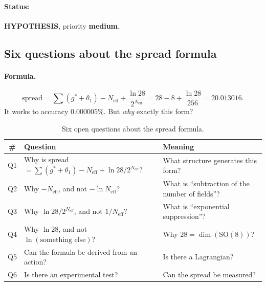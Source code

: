 \documentclass[11pt,a4paper]{article}
\newcommand{\SO}{\mathrm{SO}}
\newcommand{\Neff}{N_{\text{eff}}}
\theoremstyle{definition}
\begin{document}
\paragraph{Status:} \textbf{HYPOTHESIS}, priority \textbf{medium}.

\subsection{Six questions about the spread formula}
\label{subsec:six-spread-questions}

\paragraph{Formula.}
\begin{equation}
    \text{spread} = \sum(g^* + \theta_1) - \Neff 
    + \frac{\ln 28}{2^{\Neff}}
    = 28 - 8 + \frac{\ln 28}{256} = 20.013016.
\end{equation}
It works to accuracy $0.000005\%$. But \emph{why} exactly this 
form?

\begin{table}[htbp]
\centering
\caption{Six open questions about the spread formula.}
\label{tab:six-spread-questions}
\begin{tabular}{clp{6cm}}
\toprule
\# & Question & Meaning \\
\midrule
Q1 & Why is spread $= \sum(g^*+\theta_1) - \Neff + \ln 28/2^{\Neff}$? & 
    What structure generates this form? \\[0.3em]
Q2 & Why $- \Neff$, and not $-\ln \Neff$? & 
    What is ``subtraction of the number of fields''? \\[0.3em]
Q3 & Why $\ln 28/2^{\Neff}$, and not $1/\Neff$? & 
    What is ``exponential suppression''? \\[0.3em]
Q4 & Why $\ln 28$, and not $\ln(\text{something else})$? & 
    Why $28 = \dim(\SO(8))$? \\[0.3em]
Q5 & Can the formula be derived from an action? & 
    Is there a Lagrangian? \\[0.3em]
Q6 & Is there an experimental test? & 
    Can the spread be measured? \\
\bottomrule
\end{tabular}
\end{table}

\end{document}
